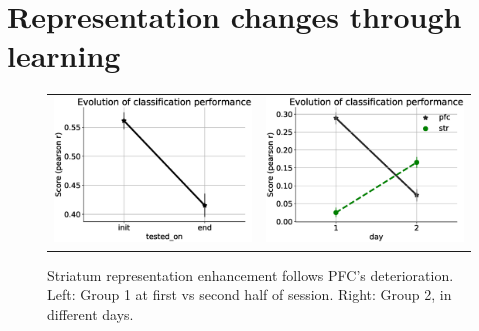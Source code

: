 \chapter{Representation changes through learning}

\begin{figure}
    \centering
    \begin{tabular}{cc}

    \includegraphics[width=7cm]{figures/PFC_init_vs_end.eps}
    & 
    \includegraphics[width=7cm]{figures/STR_PFC_day1_vs_day2_evo.eps}
    \end{tabular}
    
    \caption[Striatum representation enhancement follows PFC's deterioration]{Striatum representation enhancement follows PFC's deterioration. Left: Group 1 at first vs second half of session. Right: Group 2, in different days.}
    \label{fig:clf_decrease}
\end{figure}

